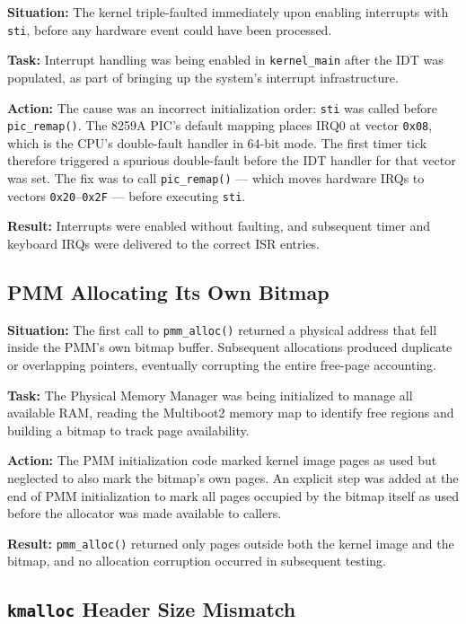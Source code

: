 \documentclass[12pt,a4paper]{article}
\begin{document}
\textbf{Situation:} The kernel triple-faulted immediately upon enabling interrupts with \texttt{sti}, before any hardware event could have been processed.

\textbf{Task:} Interrupt handling was being enabled in \texttt{kernel\_main} after the IDT was populated, as part of bringing up the system's interrupt infrastructure.

\textbf{Action:} The cause was an incorrect initialization order: \texttt{sti} was called before \texttt{pic\_remap()}. The 8259A PIC's default mapping places IRQ0 at vector \texttt{0x08}, which is the CPU's double-fault handler in 64-bit mode. The first timer tick therefore triggered a spurious double-fault before the IDT handler for that vector was set. The fix was to call \texttt{pic\_remap()} --- which moves hardware IRQs to vectors \texttt{0x20}--\texttt{0x2F} --- before executing \texttt{sti}.

\textbf{Result:} Interrupts were enabled without faulting, and subsequent timer and keyboard IRQs were delivered to the correct ISR entries.

\subsection{PMM Allocating Its Own Bitmap}

\textbf{Situation:} The first call to \texttt{pmm\_alloc()} returned a physical address that fell inside the PMM's own bitmap buffer. Subsequent allocations produced duplicate or overlapping pointers, eventually corrupting the entire free-page accounting.

\textbf{Task:} The Physical Memory Manager was being initialized to manage all available RAM, reading the Multiboot2 memory map to identify free regions and building a bitmap to track page availability.

\textbf{Action:} The PMM initialization code marked kernel image pages as used but neglected to also mark the bitmap's own pages. An explicit step was added at the end of PMM initialization to mark all pages occupied by the bitmap itself as used before the allocator was made available to callers.

\textbf{Result:} \texttt{pmm\_alloc()} returned only pages outside both the kernel image and the bitmap, and no allocation corruption occurred in subsequent testing.

\subsection{\texttt{kmalloc} Header Size Mismatch}
\end{document}

